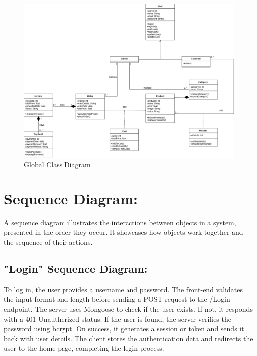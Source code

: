 \begin{figure}[!h]
\begin{center}
\includegraphics{images/Global Class Diagram.png}
\end{center}
\caption{Global Class Diagram }
\end{figure}

\newpage
\section{Sequence Diagram:}

A sequence diagram illustrates the interactions between objects in a system, presented in the order they occur. It showcases how objects work together and the sequence of their actions.

\subsection{"Login" Sequence Diagram:}

To log in, the user provides a username and password. The front-end validates the input format and length before sending a POST request to the /Login endpoint. The server uses Mongoose to check if the user exists. If not, it responds with a 401 Unauthorized status. If the user is found, the server verifies the password using bcrypt. On success, it generates a session or token and sends it back with user details. The client stores the authentication data and redirects the user to the home page, completing the login process.

